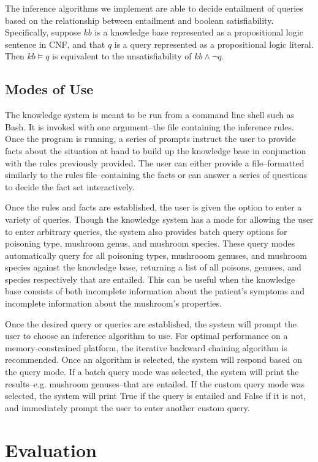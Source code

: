 \documentclass[12pt, conference, compsocconf]{IEEEtran}
\begin{document}
The inference algorithms we implement are able to decide entailment of queries based on the relationship between entailment and boolean satisfiability. 
Specifically, suppose $kb$ is a knowledge base represented as a propositional logic sentence in CNF, and that $q$ is a query represented as a propositional logic literal.
Then $kb \models q$ is equivalent to the unsatisfiability of $kb \wedge \neg q$. 

\subsection{Modes of Use}
The knowledge system is meant to be run from a command line shell such as Bash. 
It is invoked with one argument--the file containing the inference rules.
Once the program is running, a series of prompts instruct the user to provide facts about the situation at hand to build up the knowledge base in conjunction with the rules previously provided. 
The user can either provide a file--formatted similarly to the rules file--containing the facts or can answer a series of questions to decide the fact set interactively. 

Once the rules and facts are established, the user is given the option to enter a variety of queries. Though the knowledge system has a mode for allowing the user to enter arbitrary queries, the system also provides batch query options for poisoning type, mushroom genus, and mushroom species.
These query modes automatically query for all poisoning types, mushrooom genuses, and mushroom species against the knowledge base, returning a list of all poisons, genuses, and species respectively that are entailed.
This can be useful when the knowledge base consists of both incomplete information about the patient's symptoms and incomplete information about the mushroom's properties. 

Once the desired query or queries are established, the system will prompt the user to choose an inference algorithm to use. 
For optimal performance on a memory-constrained platform, the iterative backward chaining algorithm is recommended. 
Once an algorithm is selected, the system will respond based on the query mode.
If a batch query mode was selected, the system will print the results--e.g. mushroom genuses--that are entailed.
If the custom query mode was selected, the system will print True if the query is entailed and False if it is not, and immediately prompt the user to enter another custom query. 


\section{Evaluation}
\end{document}
